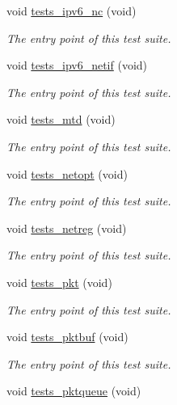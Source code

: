 \begin{DoxyCompactItemize}
void \hyperlink{group__unittests_ga011adecd50fb31c2e9fb4b402259fab3}{tests\+\_\+ipv6\+\_\+nc} (void)
\begin{DoxyCompactList}\small\item\em The entry point of this test suite. \end{DoxyCompactList}\item 
void \hyperlink{group__unittests_gaee22d83f1a9d3716168640ccd429c918}{tests\+\_\+ipv6\+\_\+netif} (void)
\begin{DoxyCompactList}\small\item\em The entry point of this test suite. \end{DoxyCompactList}\item 
void \hyperlink{group__unittests_gad7854ffe9d06ab8bcefaf3b778460f2a}{tests\+\_\+mtd} (void)
\begin{DoxyCompactList}\small\item\em The entry point of this test suite. \end{DoxyCompactList}\item 
void \hyperlink{group__unittests_gaf3cee24f6368b87755b19538a4f1564c}{tests\+\_\+netopt} (void)
\begin{DoxyCompactList}\small\item\em The entry point of this test suite. \end{DoxyCompactList}\item 
void \hyperlink{group__unittests_ga9597c8b9433b48f9ce8be48a398bd607}{tests\+\_\+netreg} (void)
\begin{DoxyCompactList}\small\item\em The entry point of this test suite. \end{DoxyCompactList}\item 
void \hyperlink{group__unittests_gac6498b5301bbbb078c592d170ae7337d}{tests\+\_\+pkt} (void)
\begin{DoxyCompactList}\small\item\em The entry point of this test suite. \end{DoxyCompactList}\item 
void \hyperlink{group__unittests_gaa089380b8bfe478c2b7f3684af323767}{tests\+\_\+pktbuf} (void)
\begin{DoxyCompactList}\small\item\em The entry point of this test suite. \end{DoxyCompactList}\item 
void \hyperlink{group__unittests_ga01dc5c2a2dd69c690d952cd6e233cf60}{tests\+\_\+pktqueue} (void)

\end{DoxyCompactItemize}
